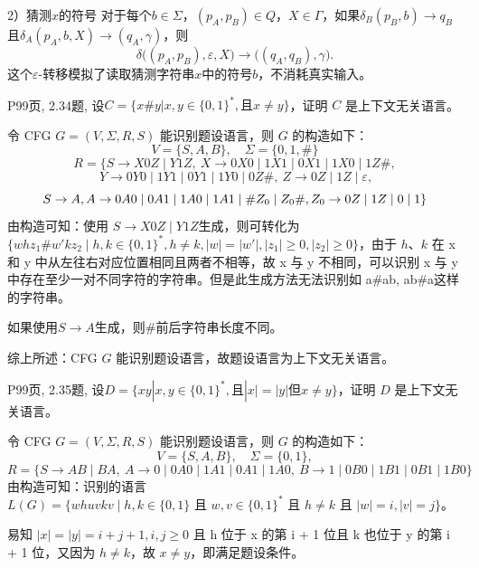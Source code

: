 \documentclass[11pt,addpoints,answers]{exam}
\begin{document}
\begin{questions}
\begin{solution}
2）猜测$x$的符号
对于每个$b \in \Sigma$，$(p_A, p_B) \in Q$，$X \in \Gamma$，如果$\delta_B(p_B, b) \rightarrow q_B$且$\delta_A(p_A, b, X) \rightarrow (q_A, \gamma)$，则
\[
\delta\big( (p_A, p_B), \varepsilon, X \big) \rightarrow \big( (q_A, q_B), \gamma \big).
\]
这个$\varepsilon$-转移模拟了读取猜测字符串$x$中的符号$b$，不消耗真实输入。

	\end{solution} 





    \question P99页, 2.34题, 
	设$C=\{x\# y|x,y\in\{0,1\}^{*},\text{且}x\neq y\}$，证明 $C$ 是上下文无关语言。
    \begin{solution}
令 CFG \( G = (V, \Sigma, R, S) \) 能识别题设语言，则 \( G \) 的构造如下：
\[
V = \{S, A, B\}, \quad \Sigma = \{0, 1, \#\}
\]
\[
R = \{S \rightarrow X0Z \mid Y1Z,\ X \rightarrow 0X0 \mid 1X1 \mid 0X1 \mid 1X0 \mid 1Z\#,
\]
\[
\ Y \rightarrow 0Y0 \mid 1Y1 \mid 0Y1 \mid 1Y0 \mid 0Z\#,\ Z \rightarrow 0Z \mid 1Z \mid \varepsilon,
\]
\[
S \rightarrow A, \space A \rightarrow 0A0\mid 0A1\mid 1A0\mid 1A1\mid \#Z_0\mid Z_0\#, \space Z_0 \rightarrow 0Z \mid 1Z \mid 0 \mid 1 \}
\]
由构造可知：使用 \( S \rightarrow X0Z \mid Y1Z \)生成，则可转化为 \(\{w h z_1 \# w' k z_2 \mid h,k \in \{0,1\}^*, h \neq k, |w| = |w'|, |z_1| \geq 0, |z_2| \geq 0\}\)，由于 \( h \)、\( k \) 在 x 和 y 中从左往右对应位置相同且两者不相等，故 x 与 y 不相同，可以识别 x 与 y 中存在至少一对不同字符的字符串。但是此生成方法无法识别如 a\#ab, ab\#a这样的字符串。

如果使用\(S \rightarrow A\)生成，则\#前后字符串长度不同。

综上所述：CFG \( G \) 能识别题设语言，故题设语言为上下文无关语言。
	\end{solution} 



    
    \question P99页, 2.35题, 
	设$D=\{x y|x,y\in\{0,1\}^{*},\text{且}|x|= |y|\text{但}x\neq y\}$，证明 $D$ 是上下文无关语言。
    \begin{solution}
令 CFG \( G = (V, \Sigma, R, S) \) 能识别题设语言，则 \( G \) 的构造如下：
\[
V = \{S, A, B\}, \quad \Sigma = \{0, 1\}, \]
\[
R = \{S \rightarrow AB \mid BA,\ A \rightarrow 0 \mid 0A0 \mid 1A1 \mid 0A1 \mid 1A0,\ B \rightarrow 1 \mid 0B0 \mid 1B1 \mid 0B1 \mid 1B0\}
\]
由构造可知：识别的语言 \( L(G) = \{w h u v k v \mid h,k \in \{0,1\} \text{ 且 } w,v \in \{0,1\}^* \text{ 且 } h \neq k \text{ 且 } |w| = i, |v| = j\} \)。

易知 \( |x| = |y| = i + j + 1, i,j \geq 0 \) 且 h 位于 x 的第 i + 1 位且 k 也位于 y 的第 i + 1 位，又因为 \( h \neq k \)，故 \( x \neq y \)，即满足题设条件。
	\end{solution} 






\end{questions}
\end{document}
